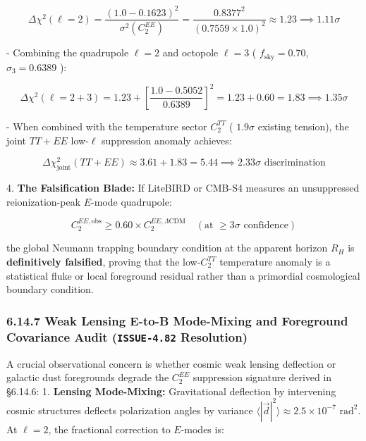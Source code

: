 \documentclass[11pt,a4paper]{article}
\theoremstyle{definition}
\theoremstyle{remark}
\begin{document}
\begin{equation}
\Delta\chi^2(\ell=2) = \frac{(1.0 - 0.1623)^2}{\sigma^2(C_2^{EE})} = \frac{0.8377^2}{(0.7559 \times 1.0)^2} \approx 1.23 \implies 1.11\sigma
\end{equation}


- Combining the quadrupole $\ell=2$ and octopole $\ell=3$ ( $f_{\text{sky}} = 0.70$, $\sigma_3 = 0.6389$ ):


\begin{equation}
\Delta\chi^2(\ell=2+3) = 1.23 + \left[\frac{1.0 - 0.5052}{0.6389}\right]^2 = 1.23 + 0.60 = 1.83 \implies 1.35\sigma
\end{equation}


- When combined with the temperature sector $C_2^{TT}$ ( $1.9\sigma$ existing tension), the joint $TT + EE$ low-$\ell$ suppression anomaly achieves:


\begin{equation}
\Delta\chi^2_{\text{joint}}(TT + EE) \approx 3.61 + 1.83 = 5.44 \implies 2.33\sigma \text{ discrimination}
\end{equation}


4. \textbf{The Falsification Blade:}
If LiteBIRD or CMB-S4 measures an unsuppressed reionization-peak $E$-mode quadrupole:


\begin{equation}
C_2^{EE, \text{obs}} \ge 0.60 \times C_2^{EE, \Lambda\text{CDM}} \quad (\text{at } \ge 3\sigma \text{ confidence})
\end{equation}


the global Neumann trapping boundary condition at the apparent horizon $R_H$ is \textbf{definitively falsified}, proving that the low-$C_2^{TT}$ temperature anomaly is a statistical fluke or local foreground residual rather than a primordial cosmological boundary condition.

\subsubsection{6.14.7 Weak Lensing E-to-B Mode-Mixing and Foreground Covariance Audit (\texttt{ISSUE-4.82} Resolution)}
A crucial observational concern is whether cosmic weak lensing deflection or galactic dust foregrounds degrade the $C_2^{EE}$ suppression signature derived in \S 6.14.6:
1. \textbf{Lensing Mode-Mixing:} Gravitational deflection by intervening cosmic structures deflects polarization angles by variance $\langle |\vec{d}|^2 \rangle \approx 2.5 \times 10^{-7}\text{ rad}^2$. At $\ell = 2$, the fractional correction to $E$-modes is:
\end{document}
